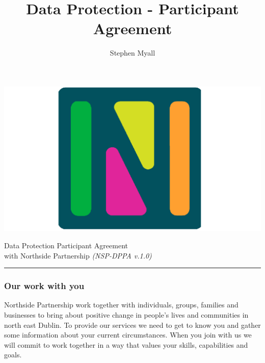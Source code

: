 \documentclass[a4paper,10pt]{article}
\title{Data Protection - Participant Agreement}
\author{Stephen Myall}
\begin{document}
\pagestyle{empty}  %
\noindent
\begin{minipage}{.15\textwidth}
 {\includegraphics[scale = 0.18]{logo.png}}
\end{minipage}%
\begin{minipage}{.7\textwidth}
\begin{center}
{\huge Data Protection Participant Agreement}  \\  {\large with Northside Partnership \textit{{\small (NSP-DPPA v.1.0)}}} \\ 
\end{center}
\end{minipage}%
\begin{minipage}{.15\textwidth}
\end{minipage}

\rule{\linewidth}{0.2 mm} 
\subsubsection*{Our work with you}
\vspace*{-8pt}%
{\small Northside Partnership work together with individuals, groups, families and businesses to bring about positive change in people’s lives and communities in north east Dublin.  To provide our services we need to get to know you and gather some information about your current circumstances.  When you join with us we will commit to work together in a way that values your skills, capabilities and goals.} \\
\end{document}
